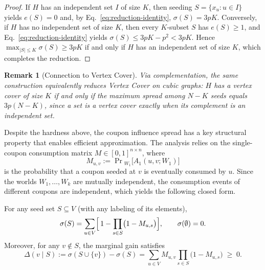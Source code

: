 \documentclass[sigconf]{acmart}
\newtheorem{remark}{Remark}[section]
\begin{document}
\begin{proof}
If $H$ has an independent set $I$ of size $K$, then seeding
$S=\{x_u:u\in I\}$ yields $e(S)=0$ and, by
Eq.~\eqref{eq:reduction-identity}, $\sigma(S)=3pK$.
Conversely, if $H$ has no independent set of size $K$, then every
$K$-subset $S$ has $e(S)\ge 1$, and
Eq.~\eqref{eq:reduction-identity} yields
$\sigma(S)\le 3pK-p^2<3pK$.
Hence $\max_{|S|\le K}\sigma(S)\ge 3pK$ if and only if $H$ has an
independent set of size $K$, which completes the reduction.
\end{proof}

\begin{remark}[Connection to Vertex Cover]
\label{rem:vc}
Via complementation, the same construction equivalently reduces
Vertex Cover on cubic graphs: $H$ has a vertex cover of size $K$ if
and only if the maximum spread among $N-K$ seeds equals $3p(N-K)$,
since a set is a vertex cover exactly when its complement is an
independent set.
\end{remark}

Despite the hardness above, the coupon influence spread has a key
structural property that enables efficient approximation.
The analysis relies on the single-coupon consumption matrix
$M\in[0,1]^{n\times n}$, where
\begin{equation}
\label{eq:consume-prob}
M_{u,v}
:=
\Pr{}_{W_1}\bigl[A_1(u,v;W_1)\bigr]
\end{equation}
is the probability that a coupon seeded at $v$ is eventually consumed
by $u$.
Since the worlds $W_1,\ldots,W_k$ are mutually independent, the
consumption events of different coupons are independent, which yields
the following closed form.

\begin{lemma}
\label{lem:closed-form}
For any seed set $S\subseteq V$ (with any labeling of its elements),
\begin{equation}
\label{eq:closed-form}
\sigma(S)
=
\sum_{u\in V}\Bigl[\,1-\prod_{s\in S}\bigl(1-M_{u,s}\bigr)\Bigr],
\qquad
\sigma(\emptyset)=0.
\end{equation}
Moreover, for any $v\notin S$, the marginal gain satisfies
\begin{equation}
\label{eq:marginal}
\Delta(v\mid S)
:=
\sigma(S\cup\{v\})-\sigma(S)
=
\sum_{u\in V} M_{u,v}\prod_{s\in S}\bigl(1-M_{u,s}\bigr)
\;\ge\; 0.
\end{equation}
\end{lemma}
\end{document}
